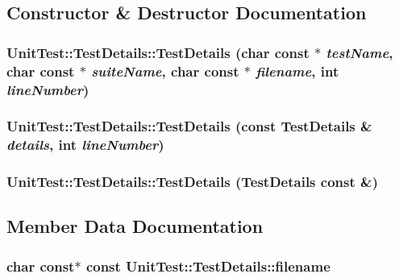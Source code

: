 \subsection{Constructor \& Destructor Documentation}
\hypertarget{class_unit_test_1_1_test_details_9317f51ef0865b042c8180ea691eccaa}{
\subsubsection[{TestDetails}]{\setlength{\rightskip}{0pt plus 5cm}UnitTest::TestDetails::TestDetails (char const $\ast$ {\em testName}, \/  char const $\ast$ {\em suiteName}, \/  char const $\ast$ {\em filename}, \/  int {\em lineNumber})}}
\label{class_unit_test_1_1_test_details_9317f51ef0865b042c8180ea691eccaa}


\hypertarget{class_unit_test_1_1_test_details_780f29f93d4e7016ee3426ad5ea62cb3}{
\subsubsection[{TestDetails}]{\setlength{\rightskip}{0pt plus 5cm}UnitTest::TestDetails::TestDetails (const {\bf TestDetails} \& {\em details}, \/  int {\em lineNumber})}}
\label{class_unit_test_1_1_test_details_780f29f93d4e7016ee3426ad5ea62cb3}


\hypertarget{class_unit_test_1_1_test_details_fc3836360e570a6c6a1b696c2ee2f73d}{
\subsubsection[{TestDetails}]{\setlength{\rightskip}{0pt plus 5cm}UnitTest::TestDetails::TestDetails ({\bf TestDetails} const \&)}}
\label{class_unit_test_1_1_test_details_fc3836360e570a6c6a1b696c2ee2f73d}




\subsection{Member Data Documentation}
\hypertarget{class_unit_test_1_1_test_details_6e704305c58485f37fcabfe1f7c35723}{
\subsubsection[{filename}]{\setlength{\rightskip}{0pt plus 5cm}char const$\ast$ const {\bf UnitTest::TestDetails::filename}}}
\label{class_unit_test_1_1_test_details_6e704305c58485f37fcabfe1f7c35723}


